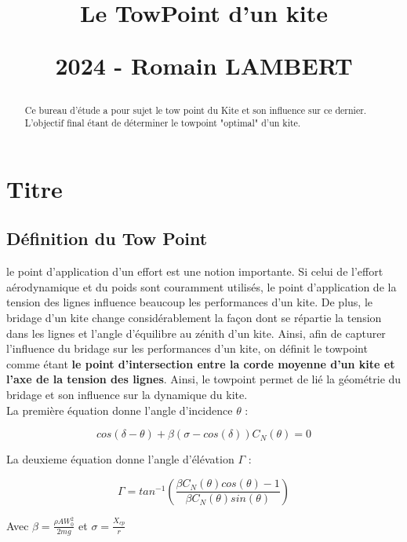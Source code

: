 \documentclass[conference]{IEEEtran}
\begin{document}
\title{\LARGE Le TowPoint d'un kite
\vskip10pt

\small 2024 - Romain LAMBERT
}
\maketitle

\begin{abstract}Ce bureau d'étude a pour sujet le tow point du Kite et son influence sur ce dernier. L'objectif final étant de déterminer le towpoint "optimal" d'un kite. 
\end{abstract}
\IEEEoverridecommandlockouts

\IEEEpeerreviewmaketitle
\section{Titre}

\subsection{Définition du Tow Point} 

le point d'application d'un effort est une notion importante. Si celui de l'effort aérodynamique et du poids sont couramment utilisés, le point d'application de la tension des lignes influence beaucoup les performances d'un kite. De plus, le bridage d'un kite change considérablement la façon dont se répartie la tension dans les lignes et l'angle d'équilibre au zénith d'un kite. Ainsi, afin de capturer l'influence du bridage sur les performances d'un kite, on définit le towpoint comme étant \textbf{le point d'intersection entre la corde moyenne d'un kite et l'axe de la tension des lignes}. Ainsi, le towpoint permet de lié la géométrie du bridage et son influence sur la dynamique du kite.  \\


La première équation donne l’angle d’incidence $\theta$ : 
\begin{center}
    \begin{equation}
        cos(\delta - \theta) + \beta (\sigma-cos(\delta))C_N(\theta) = 0
        \label{eq:theta}
    \end{equation}
\end{center}
La deuxieme équation donne l’angle d’élévation $\Gamma$ :
\begin{center}
    \begin{equation}
        \Gamma = tan^{-1}(\frac{\beta C_N (\theta) cos(\theta)-1}{\beta C_N (\theta)sin(\theta)})
        \label{eq:gamma}
    \end{equation}
\end{center}
Avec $\beta = \frac{\rho A W_0^2}{2mg}$ et $\sigma = \frac{X_{cp}}{r}$ \\
\end{document}
